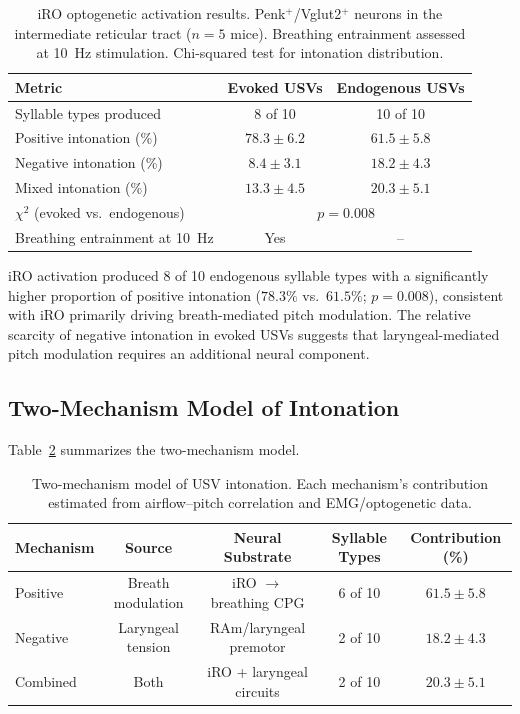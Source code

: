 \documentclass[11pt]{article}
\begin{document}
\begin{table}[H]
\centering
\caption{iRO optogenetic activation results. Penk$^+$/Vglut2$^+$ neurons in the intermediate reticular tract ($n = 5$ mice). Breathing entrainment assessed at 10~Hz stimulation. Chi-squared test for intonation distribution.}
\label{tab:iro}
\begin{tabular}{lcc}
\toprule
Metric & Evoked USVs & Endogenous USVs \\
\midrule
Syllable types produced & 8 of 10 & 10 of 10 \\
Positive intonation (\%) & $78.3 \pm 6.2$ & $61.5 \pm 5.8$ \\
Negative intonation (\%) & $8.4 \pm 3.1$ & $18.2 \pm 4.3$ \\
Mixed intonation (\%) & $13.3 \pm 4.5$ & $20.3 \pm 5.1$ \\
$\chi^2$ (evoked vs.\ endogenous) & \multicolumn{2}{c}{$p = 0.008$} \\
Breathing entrainment at 10~Hz & Yes & -- \\
\bottomrule
\end{tabular}
\end{table}

iRO activation produced 8 of 10 endogenous syllable types with a significantly higher proportion of positive intonation ($78.3\%$ vs.\ $61.5\%$; $p = 0.008$), consistent with iRO primarily driving breath-mediated pitch modulation. The relative scarcity of negative intonation in evoked USVs suggests that laryngeal-mediated pitch modulation requires an additional neural component.

\subsection{Two-Mechanism Model of Intonation}

Table~\ref{tab:model} summarizes the two-mechanism model.

\begin{table}[H]
\centering
\caption{Two-mechanism model of USV intonation. Each mechanism's contribution estimated from airflow--pitch correlation and EMG/optogenetic data.}
\label{tab:model}
\begin{tabular}{lcccc}
\toprule
Mechanism & Source & Neural Substrate & Syllable Types & Contribution (\%) \\
\midrule
Positive & Breath modulation & iRO $\to$ breathing CPG & 6 of 10 & $61.5 \pm 5.8$ \\
Negative & Laryngeal tension & RAm/laryngeal premotor & 2 of 10 & $18.2 \pm 4.3$ \\
Combined & Both & iRO + laryngeal circuits & 2 of 10 & $20.3 \pm 5.1$ \\
\bottomrule
\end{tabular}
\end{table}
\end{document}

